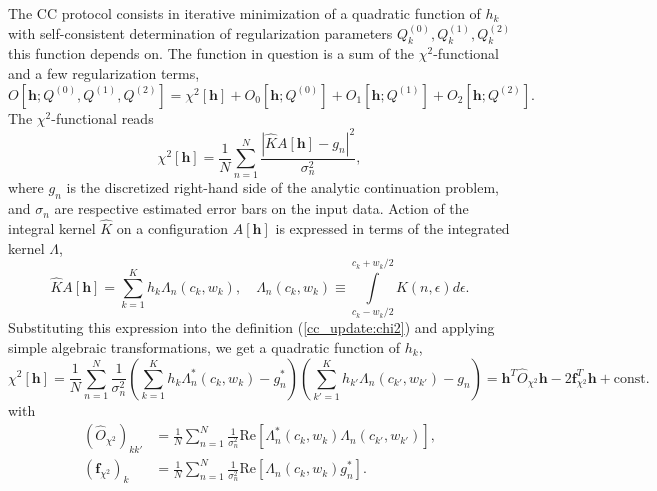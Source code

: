 \documentclass[]{article}
\begin{document}
The CC protocol consists in iterative minimization of a quadratic function of $h_k$ with self-consistent determination of regularization parameters $Q^{(0)}_k, Q^{(1)}_k, Q^{(2)}_k$ this function depends on. The function in question is a sum of the $\chi^2$-functional and a few regularization terms,
\begin{equation}
    O[\mathbf{h}; Q^{(0)},Q^{(1)},Q^{(2)}] = \chi^2[\mathbf{h}]
     + O_0[\mathbf{h};Q^{(0)}]
     + O_1[\mathbf{h};Q^{(1)}]
     + O_2[\mathbf{h};Q^{(2)}].
\end{equation}
The $\chi^2$-functional reads
\begin{equation}\label{cc_update:chi2}
    \chi^2[\mathbf{h}] = \frac{1}{N} \sum_{n=1}^{N}
        \frac{|\hat K A[\mathbf{h}] - g_n|^2}{\sigma^2_n},
\end{equation}
where $g_n$ is the discretized right-hand side of the analytic continuation problem, and $\sigma_n$ are respective estimated error bars on the input data. Action of the integral kernel $\hat K$ on a configuration $A[\mathbf{h}]$ is expressed in terms of the integrated kernel $\Lambda$,
\begin{equation}
    \hat K A[\mathbf{h}] = \sum_{k=1}^K h_k \Lambda_n(c_k, w_k), \quad
    \Lambda_n(c_k, w_k) \equiv
    \int\limits_{c_k-w_k/2}^{c_k+w_k/2} K(n,\epsilon) d\epsilon.
\end{equation}
Substituting this expression into the definition (\ref{cc_update:chi2}) and applying simple algebraic transformations, we get a quadratic function of $h_k$,
\begin{equation}
    \chi^2[\mathbf{h}] =
    \frac{1}{N} \sum_{n=1}^N \frac{1}{\sigma_n^2}
    \left(\sum_{k=1}^K h_k \Lambda_n^*(c_k, w_k) - g^*_n\right)
    \left(\sum_{k'=1}^K h_{k'} \Lambda_n(c_{k'}, w_{k'}) - g_n\right) =
    \mathbf{h}^T \hat O_{\chi^2} \mathbf{h}
    -2\mathbf{f}^T_{\chi^2} \mathbf{h} + \mathrm{const}.
\end{equation}
with
\begin{align}\label{cc_update:chi2_mat_and_f}
    (\hat O_{\chi^2})_{kk'} &= \frac{1}{N} \sum_{n=1}^N \frac{1}{\sigma_n^2}
        \mathrm{Re}\left[
        \Lambda^*_n(c_k, w_k) \Lambda_n(c_{k'}, w_{k'})
        \right],\nonumber\\
    (\mathbf{f}_{\chi^2})_k &= \frac{1}{N} \sum_{n=1}^N \frac{1}{\sigma_n^2}
        \mathrm{Re}\left[\Lambda_n(c_k, w_k) g_n^*\right].
\end{align}
\end{document}
